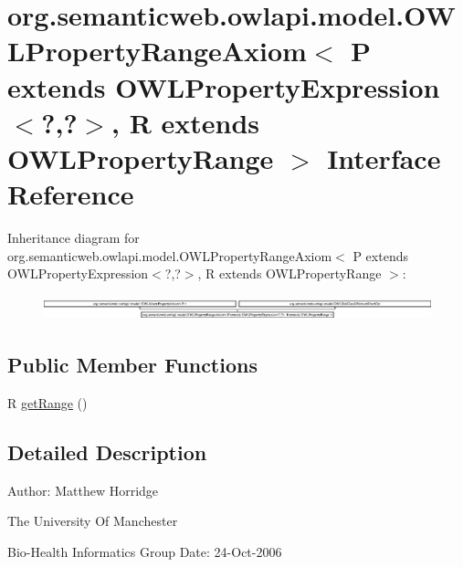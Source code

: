 \hypertarget{interfaceorg_1_1semanticweb_1_1owlapi_1_1model_1_1_o_w_l_property_range_axiom_3_01_p_01extends_0016041f731c436c22402051e6973b9f3}{\section{org.\-semanticweb.\-owlapi.\-model.\-O\-W\-L\-Property\-Range\-Axiom$<$ P extends O\-W\-L\-Property\-Expression$<$?,?$>$, R extends O\-W\-L\-Property\-Range $>$ Interface Reference}
\label{interfaceorg_1_1semanticweb_1_1owlapi_1_1model_1_1_o_w_l_property_range_axiom_3_01_p_01extends_0016041f731c436c22402051e6973b9f3}
}
Inheritance diagram for org.\-semanticweb.\-owlapi.\-model.\-O\-W\-L\-Property\-Range\-Axiom$<$ P extends O\-W\-L\-Property\-Expression$<$?,?$>$, R extends O\-W\-L\-Property\-Range $>$\-:\begin{figure}[H]
\begin{center}
\leavevmode
\includegraphics[height=0.716113cm]{interfaceorg_1_1semanticweb_1_1owlapi_1_1model_1_1_o_w_l_property_range_axiom_3_01_p_01extends_0016041f731c436c22402051e6973b9f3}
\end{center}
\end{figure}
\subsection*{Public Member Functions}
\begin{DoxyCompactItemize}
\item 
R \hyperlink{interfaceorg_1_1semanticweb_1_1owlapi_1_1model_1_1_o_w_l_property_range_axiom_3_01_p_01extends_0016041f731c436c22402051e6973b9f3_a3ec11d5d8831092e017df35de4f9cc9a}{get\-Range} ()
\end{DoxyCompactItemize}


\subsection{Detailed Description}
Author\-: Matthew Horridge\par
 The University Of Manchester\par
 Bio-\/\-Health Informatics Group Date\-: 24-\/\-Oct-\/2006 

